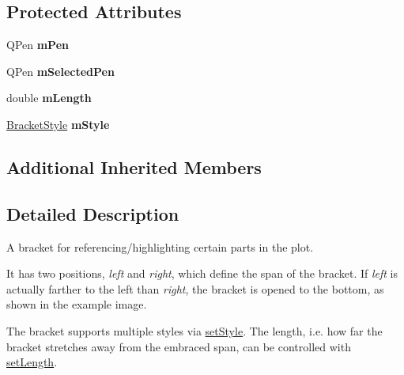 \subsection*{Protected Attributes}
\begin{DoxyCompactItemize}
\item 
Q\+Pen {\bfseries m\+Pen}\hypertarget{class_q_c_p_item_bracket_a350c864a5853b04343719f5a8be6b675}{}\label{class_q_c_p_item_bracket_a350c864a5853b04343719f5a8be6b675}

\item 
Q\+Pen {\bfseries m\+Selected\+Pen}\hypertarget{class_q_c_p_item_bracket_adcfb53602d1802d00e2de4fd6df6b291}{}\label{class_q_c_p_item_bracket_adcfb53602d1802d00e2de4fd6df6b291}

\item 
double {\bfseries m\+Length}\hypertarget{class_q_c_p_item_bracket_ab3d99bba8da18eb4d0e0cb23dded33b2}{}\label{class_q_c_p_item_bracket_ab3d99bba8da18eb4d0e0cb23dded33b2}

\item 
\hyperlink{class_q_c_p_item_bracket_a7ac3afd0b24a607054e7212047d59dbd}{Bracket\+Style} {\bfseries m\+Style}\hypertarget{class_q_c_p_item_bracket_ac911907184c824d621f274f8e0990080}{}\label{class_q_c_p_item_bracket_ac911907184c824d621f274f8e0990080}

\end{DoxyCompactItemize}
\subsection*{Additional Inherited Members}


\subsection{Detailed Description}
A bracket for referencing/highlighting certain parts in the plot. 

 It has two positions, {\itshape left} and {\itshape right}, which define the span of the bracket. If {\itshape left} is actually farther to the left than {\itshape right}, the bracket is opened to the bottom, as shown in the example image.

The bracket supports multiple styles via \hyperlink{class_q_c_p_item_bracket_a612dffa2373422eef8754d690add3703}{set\+Style}. The length, i.\+e. how far the bracket stretches away from the embraced span, can be controlled with \hyperlink{class_q_c_p_item_bracket_ac7cfc3da7da9b5c5ac5dfbe4f0351b2a}{set\+Length}.

